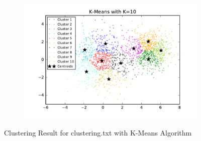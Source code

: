 \begin{description}
\begin{figure}[htb]
\begin{subfigure}[b]{0.475\textwidth}
        \end{subfigure}
        \hfill
        \begin{subfigure}[b]{0.475\textwidth}   
            \centering 
            \includegraphics[width=\textwidth]{./figures/clustering_kMeans_10.pdf}
        \end{subfigure}
        
        \caption{Clustering Result for clustering.txt with K-Means Algorithm}
        \label{fig:kmean_clustering}
\end{figure}


\end{description}
